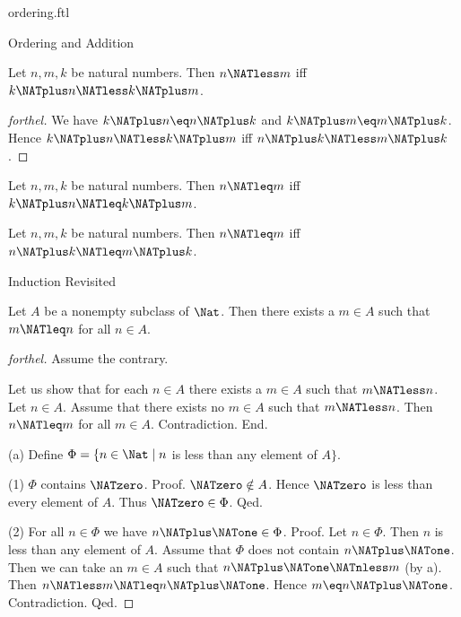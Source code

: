 \documentclass{naproche-library}
\begin{document}
\begin{smodule}[title=The Standard Ordering of the Natural Numbers]{ordering.ftl}
\begin{sfragment}{Ordering and Addition}
  \begin{corollary}[forthel,id=ARITHMETIC_04_1901366129721344]
    Let $n, m, k$ be natural numbers.
    Then $n \NATless m$ iff $k \NATplus n \NATless k \NATplus m$.
  \end{corollary}
  \begin{proof}[forthel]
    We have $k \NATplus n \eq n \NATplus k$ and $k \NATplus m \eq m \NATplus k$.
    Hence $k \NATplus n \NATless k \NATplus m$ iff $n \NATplus k \NATless m \NATplus k$.
  \end{proof}

  \begin{corollary}[forthel,id=ARITHMETIC_04_4203390999461888]
    Let $n, m, k$ be natural numbers.
    Then $n \NATleq m$ iff $k \NATplus n \NATleq k \NATplus m$.
  \end{corollary}

  \begin{corollary}[forthel,id=ARITHMETIC_04_5512590832697344]
    Let $n, m, k$ be natural numbers.
    Then $n \NATleq m$ iff $n \NATplus k \NATleq m \NATplus k$.
  \end{corollary}
\end{sfragment}

\begin{sfragment}{Induction Revisited}
  \begin{proposition}[forthel,id=ARITHMETIC_04_272317502455808]
    Let $A$ be a nonempty subclass of $\Nat$.
    Then there exists a $m \in A$ such that $m \NATleq n$ for all $n \in A$.
  \end{proposition}
  \begin{proof}[forthel]
    Assume the contrary.

    Let us show that for each $n \in A$ there exists a $m \in A$ such that $m \NATless n$.
      Let $n \in A$.
      Assume that there exists no $m \in A$ such that $m \NATless n$.
      Then $n \NATleq m$ for all $m \in A$.
      Contradiction.
    End.

    (a) Define $\Phi = \{ n \in \Nat \mid n$ is less than any element of $A \}$.

    (1) $\Phi$ contains $\NATzero$. \newline
    Proof.
      $\NATzero \notin A$.
      Hence $\NATzero$ is less than every element of $A$.
      Thus $\NATzero \in \Phi$.
    Qed.

    (2) For all $n \in \Phi$ we have $n \NATplus \NATone \in \Phi$. \newline
    Proof.
      Let $n \in \Phi$.
      Then $n$ is less than any element of $A$.
      Assume that $\Phi$ does not contain $n \NATplus \NATone$.
      Then we can take an $m \in A$ such that $n \NATplus \NATone \NATnless m$ (by a).
      Then $n \NATless m \NATleq n \NATplus \NATone$.
      Hence $m \eq n \NATplus \NATone$.
      Contradiction.
    Qed.


\end{proof}
\end{sfragment}
\end{smodule}
\end{document}
